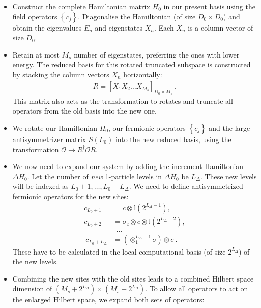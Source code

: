 \begin{itemize}
	\item[{\it S1.}] Construct the complete Hamiltonian matrix \(H_0\) in our present basis using the field operators \(\left\{c_j\right\}\). Diagonalise the Hamiltonian (of size \(D_0 \times D_0\)) and obtain the eigenvalues \({E_n}\) and eigenstates \({X_n}\). Each \(X_n\) is a column vector of size \(D_0\).
	\item[{\it S2.}] Retain at most \(M_s\) number of eigenstates, preferring the ones with lower energy. The reduced basis for this rotated truncated subspace is constructed by stacking the column vectors \(X_n\) horizontally:
		\begin{equation}\begin{aligned}\label{rotationMatrix}
			R = [X_1 X_2 \ldots X_{M_s}]_{D_0\times M_s}~.
		\end{aligned}\end{equation}
		This matrix also acts as the transformation to rotates and truncate all operators from the old basis into the new one.
	\item[{\it S3.}] We rotate our Hamiltonian \(H_0\), our fermionic operators \(\left\{ c_j \right\} \) and the large antisymmetrizer matrix \(S(L_0)\) into the new reduced basis, using the transformation \(\mathcal{O} \to R^\dagger \mathcal{O} R\).
	\item[{\it S4.}] We now need to expand our system by adding the increment Hamiltonian \(\Delta H_0\). Let the number of {\it new } 1-particle levels in \(\Delta H_0\) be \(L_\Delta\). These new levels will be indexed as \(L_0+1,\ldots,L_0+L_\Delta\). We need to define antisymmetrized fermionic operators for the new sites:
		\begin{equation}\begin{aligned}
			c_{L_0+1} &= c \otimes \mathbb{I}(2^{L_\Delta - 1}),\\
			c_{L_0+2} &= \sigma_z \otimes c \otimes \mathbb{I}(2^{L_\Delta - 2}),\\
					   &~~ \ldots~\\
			~c_{L_0+L_\Delta} &= (\otimes_1^{L_\Delta-1} \sigma) \otimes c ~.
		\end{aligned}\end{equation}
		These have to be calculated in the local computational basis (of size \(2^{L_\Delta}\)) of the new levels. 
	\item[{\it S5.}] Combining the new sites with the old sites leads to a combined Hilbert space dimension of \((M_s + 2^{L_\Delta}) \times (M_s + 2^{L_\Delta})\). To allow all operators to act on the enlarged Hilbert space, we expand both sets of operators:

\end{itemize}
